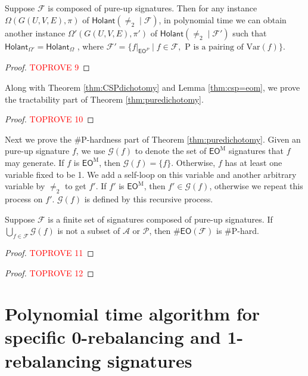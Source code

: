 \documentclass[a4paper,UKenglish,cleveref, autoref, thm-restate]{lipics-v2021}
\newcommand{\hol}[0]{\textsf{Holant}}
\newcommand{\eo}[0]{\textsf{EO}}
\newcommand{\eom}[1][\text{M}]{\textsf{EO}^{#1}}
\begin{document}
\begin{lemma} \label{lem:alluptocsp}
    Suppose $\mathcal{F}$ is composed of pure-up signatures. Then for any instance $\Omega(G(U,V,E),\pi)$ of $\hol(\neq_2\mid\mathcal{F})$, in polynomial time we can obtain another instance $\Omega'(G(U,V,E),\pi')$ of $\hol(\neq_2\mid\mathcal{F}')$ such that $\hol_{\Omega'}=\hol_\Omega$ , where $\mathcal{F}'=\{f|_{\eom[P]}\mid f\in\mathcal{F},\text{ P is a pairing of Var}(f)\}$. 
    
    
\end{lemma}

\begin{proof}\textcolor{red}{TOPROVE 9}\end{proof}

Along with Theorem \ref{thm:CSPdichotomy} and Lemma \ref{thm:csp=eom}, we prove the tractability part of Theorem \ref{thm:puredichotomy}.

\begin{proof}\textcolor{red}{TOPROVE 10}\end{proof}

Next we prove the \#P-hardness part of Theorem \ref{thm:puredichotomy}. 
Given an pure-up signature $f$, we use $\mathcal{G}(f)$ to denote the set of $\eom$ signatures that $f$ may generate. If $f$ is $\eom$, then $\mathcal{G}(f)=\{f\}$. Otherwise, $f$ has at least one variable fixed to be 1. We add a self-loop on this variable and another arbitrary variable by $\neq_2$ to get $f'$. If $f'$ is $\eom$, then $f'\in\mathcal{G}(f)$, otherwise we repeat this process on $f'$. $\mathcal{G}(f)$ is defined by this recursive process. 

\begin{lemma}\label{lem:alluphardness}
Suppose $\mathcal{F}$ is a finite set of signatures composed of pure-up  signatures. If $\bigcup_{f\in\mathcal{F}}\mathcal{G}(f)$ is not a subset of $\mathscr{A}$ or $\mathscr{P}$, then $\#\eo(\mathcal{F})$ is \#P-hard.
\end{lemma}
\begin{proof}\textcolor{red}{TOPROVE 11}\end{proof}


\begin{proof}\textcolor{red}{TOPROVE 12}\end{proof}


\section{Polynomial time algorithm for specific 0-rebalancing and 1-rebalancing signatures}\label{balancing}
\end{document}

